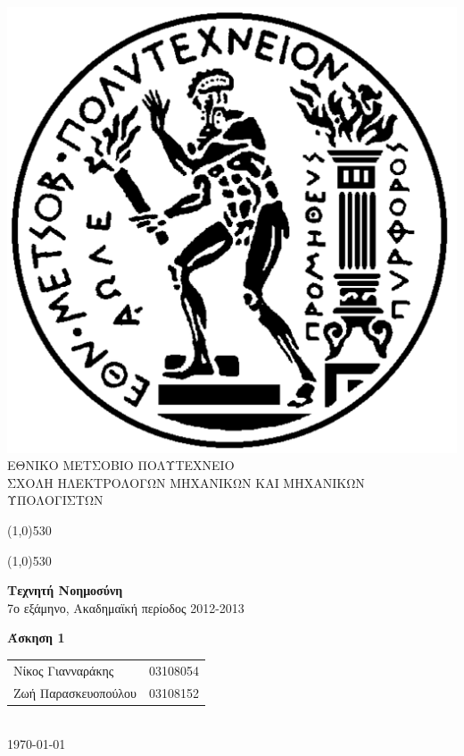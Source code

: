 \documentclass[12pt]{article}
\begin{document}
\begin{titlepage}
\begin{center}

\includegraphics[scale=0.15]{pyrforos.pdf}\\
ΕΘΝΙΚΟ ΜΕΤΣΟΒΙΟ ΠΟΛΥΤΕΧΝΕΙΟ \\
ΣΧΟΛΗ ΗΛΕΚΤΡΟΛΟΓΩΝ ΜΗΧΑΝΙΚΩΝ KΑΙ ΜΗΧΑΝΙΚΩΝ ΥΠΟΛΟΓΙΣΤΩΝ \\ 
\vspace{0.5em}

\medskip 

\def\doubleline{

    \vspace{0.1em}
    \line(1,0){530}\

    \vspace{-1.5em}
    \line(1,0){530}

}
\doubleline
\vspace{1.3em}

{\large \textbf{Τεχνητή Νοημοσύνη}\\
 \medskip
7ο εξάμηνο, Ακαδημαϊκή περίοδος 2012-2013 \\ \bigskip \medskip}

\vspace{1.5em}
{\LARGE \textbf{Άσκηση 1\\}}
\vspace{32em}

\begin{tabular}{l l}
Νίκος Γιανναράκης & 03108054 \\
Ζωή Παρασκευοπούλου & 03108152 \\
\end{tabular}\\
\bigskip
\today
\end{center}
\end{titlepage}
\tableofcontents
\end{document}
